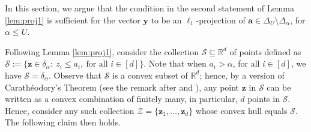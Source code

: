 \label{app:projection}
In this section, we argue that the condition in the second statement of Lemma \ref{lem:proj1} is sufficient for the vector $\mathbf{y}$ to be an $\ell_1$-projection of $\mathbf{a}\in \Delta_U\setminus \Delta_\alpha$, for $\alpha\leq U$.

Following Lemma \ref{lem:proj1}, consider the collection $\mathcal{S}\subseteq \mathbb{R}^d$ of points defined as $\mathcal{S}:= \{\mathbf{z}\in \delta_\alpha:\ z_i\leq a_i,\ \text{for all $i\in [d]$}\}$. Note that  when $a_i>\alpha$, for all $i\in [d]$, we have $\mathcal{S} = \delta_\alpha$. Observe that $\mathcal{S}$ is a convex subset of $\mathbb{R}^d$; hence, by a version of Carath\'eodory's Theorem (see the remark after \cite[Thm. 15.3.5]{cover_thomas} and \cite{carath}), any point $\mathbf{z}$ in $\mathcal{S}$ can be written as a convex combination of finitely many, in particular, $d$ points in $\mathcal{S}$. Hence, consider any such collection $\mathcal{Z} = \{\mathbf{z}_1,\ldots,\mathbf{z}_d\}$ whose convex hull equals $\mathcal{S}$. The following claim then holds.


